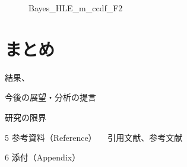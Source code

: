 \documentclass[a4j,11pt,mc]{jreport}
\begin{document}
	\begin{figure}[H]
		\begin{center}
				\caption{Bayes\_HLE\_m\_ccdf\_F2}
		\end{center}
	\end{figure}



\chapter{まとめ}\label{chapter:decision}


結果、

今後の展望・分析の提言

研究の限界



5 参考資料（Reference）
 　引用文献、参考文献

6 添付（Appendix）









\newpage
\makeatletter
\renewcommand{\@biblabel}[1]{[#1]}
\makeatother



\end{document}
